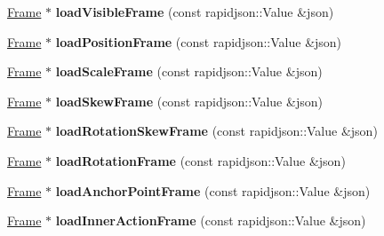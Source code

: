 \begin{DoxyCompactItemize}
\item 
\mbox{\label{classActionTimelineCache_a6adb0b06c3daa28bb601520b74337c71}} 
\hyperlink{classFrame}{Frame} $\ast$ {\bfseries load\+Visible\+Frame} (const rapidjson\+::\+Value \&json)
\item 
\mbox{\label{classActionTimelineCache_aa358cbf4e0de22bb9f18d822ab668404}} 
\hyperlink{classFrame}{Frame} $\ast$ {\bfseries load\+Position\+Frame} (const rapidjson\+::\+Value \&json)
\item 
\mbox{\label{classActionTimelineCache_a14ac52227981f1f114457e8e270f746d}} 
\hyperlink{classFrame}{Frame} $\ast$ {\bfseries load\+Scale\+Frame} (const rapidjson\+::\+Value \&json)
\item 
\mbox{\label{classActionTimelineCache_ad2e0a8cff8efef66591a3613232ef405}} 
\hyperlink{classFrame}{Frame} $\ast$ {\bfseries load\+Skew\+Frame} (const rapidjson\+::\+Value \&json)
\item 
\mbox{\label{classActionTimelineCache_aa6f9500c1a26ae51cc569dbe69e9d554}} 
\hyperlink{classFrame}{Frame} $\ast$ {\bfseries load\+Rotation\+Skew\+Frame} (const rapidjson\+::\+Value \&json)
\item 
\mbox{\label{classActionTimelineCache_a9122df0c5a3da5069cda2bba0868873c}} 
\hyperlink{classFrame}{Frame} $\ast$ {\bfseries load\+Rotation\+Frame} (const rapidjson\+::\+Value \&json)
\item 
\mbox{\label{classActionTimelineCache_ab83aa00eefe457ab5d5d4e329e7803d5}} 
\hyperlink{classFrame}{Frame} $\ast$ {\bfseries load\+Anchor\+Point\+Frame} (const rapidjson\+::\+Value \&json)
\item 
\mbox{\label{classActionTimelineCache_a936f527d38c278a3953ec4d9d23d6f7e}} 
\hyperlink{classFrame}{Frame} $\ast$ {\bfseries load\+Inner\+Action\+Frame} (const rapidjson\+::\+Value \&json)
\item 
\mbox{\label{classActionTimelineCache_a9bbc0497ab6cfd8f14775681327e20c0}} 

\end{DoxyCompactItemize}
